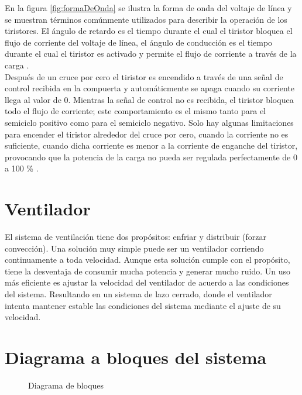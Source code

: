 \documentclass{article}
\begin{document}
    En la  figura \ref{fig:formaDeOnda} se ilustra la forma de onda del voltaje de l\'inea y se muestran t\'erminos com\'unmente utilizados para describir la operaci\'on de los tiristores. El \'angulo de retardo es el tiempo durante el cual el tiristor bloquea el flujo de corriente del voltaje de l\'inea, el \'angulo de conducci\'on es el tiempo durante el cual el tiristor es activado y permite el flujo de corriente a trav\'es de la carga \cite{littelfuse}.\\
    Despu\'es de un cruce por cero el tiristor es encendido a trav\'es de una se\~nal de control recibida en la compuerta y autom\'aticmente se apaga cuando su corriente llega al valor de 0. Mientras la se\~nal de control no es recibida, el tiristor bloquea todo el flujo de corriente; este comportamiento es el mismo tanto para el semiciclo positivo como para el semiciclo negativo. Solo hay algunas limitaciones para encender el tiristor alrededor del cruce por cero, cuando la corriente no es suficiente, cuando dicha corriente es menor a la corriente de enganche del tiristor, provocando que la potencia de la carga no pueda ser regulada perfectamente de 0 a 100 \% \cite{st}.
    
    \section{Ventilador}
    El sistema de ventilaci\'on tiene dos prop\'ositos: enfriar y distribuir (forzar convecci\'on). Una soluci\'on muy simple puede ser un ventilador corriendo continuamente a toda velocidad. Aunque esta soluci\'on cumple con el prop\'osito, tiene la desventaja de consumir mucha potencia y generar mucho ruido. Un uso m\'as eficiente es ajustar la velocidad del ventilador de acuerdo a las condiciones del sistema. Resultando en un sistema de lazo cerrado, donde el ventilador intenta mantener estable las condiciones del sistema mediante el ajuste de su velocidad.\\
    
    \section{Diagrama a bloques del sistema}

        \begin{figure}[h!]
            \centering
            \caption{Diagrama de bloques}
            \label{fig:bloques}
        \end{figure}
        
\end{document}
